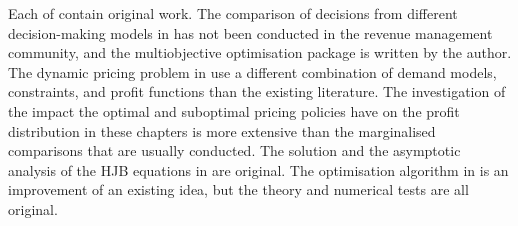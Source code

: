 \documentclass[main.tex]{subfiles}
\begin{document}
Each of
contain original work.  The comparison of decisions from different
decision-making models in  has not been conducted in
the revenue management community, and the multiobjective optimisation
package is written by the author.  The dynamic pricing problem in
 use a different combination
of demand models, constraints, and profit functions than the existing
literature.  The investigation of the impact the optimal and
suboptimal pricing policies have on the profit distribution in these
chapters is more extensive than the marginalised comparisons that are
usually conducted. The solution and the asymptotic analysis of the HJB
equations in  are original.  The optimisation
algorithm in  is an improvement of an existing idea,
but the theory and numerical tests are all original.
\end{document}
